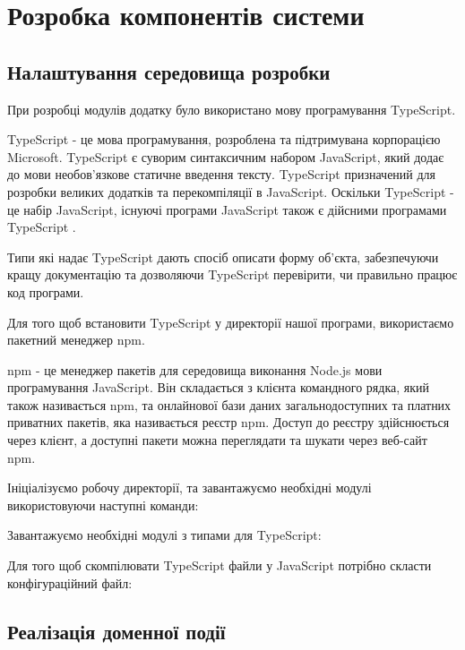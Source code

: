 \section[РОЗРОБКА КОМПОНЕНТІВ СИСТЕМИ]{Розробка компонентів системи}

\subsection{Налаштування середовища розробки}
При розробці модулів додатку було використано мову програмування TypeScript.

TypeScript - це мова програмування, розроблена та підтримувана корпорацією Microsoft.
TypeScript є суворим синтаксичним набором JavaScript, який додає до мови необов'язкове статичне введення тексту.
TypeScript призначений для розробки великих додатків та перекомпіляції в JavaScript.
Оскільки TypeScript - це набір JavaScript, існуючі програми JavaScript також є дійсними програмами TypeScript
\cite{typescript-def}.

Типи які надає TypeScript дають спосіб описати форму об'єкта,
забезпечуючи кращу документацію та дозволяючи TypeScript перевірити, чи правильно працює код програми.

Для того щоб встановити TypeScript у директорії нашої програми, використаємо пакетний менеджер npm.

npm - це менеджер пакетів для середовища виконання Node.js мови програмування JavaScript.
Він складається з клієнта командного рядка, який також називається npm,
та онлайнової бази даних загальнодоступних та платних приватних пакетів, яка називається реєстр npm.
Доступ до реєстру здійснюється через клієнт, а доступні пакети можна
переглядати та шукати через веб-сайт npm.

Ініціалізуємо робочу директорії, та завантажуємо необхідні модулі використовуючи наступні команди:


Завантажуємо необхідні модулі з типами для TypeScript:


Для того щоб скомпілювати TypeScript файли у JavaScript потрібно
скласти конфігураційний файл:


\subsection{Реалізація доменної події}

